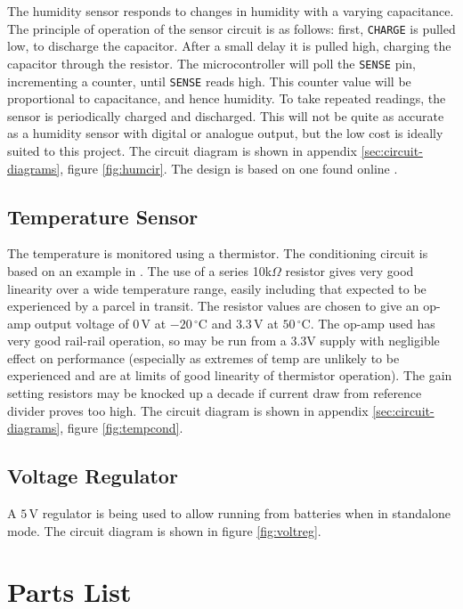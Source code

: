 \documentclass[a4paper,11pt]{article}  %
\providecommand{\degrees}{\ensuremath{^{\circ}}}
\begin{document}
The humidity sensor responds to changes in humidity with a varying
capacitance. The principle of operation of the sensor circuit is as
follows: first, \texttt{CHARGE} is pulled low, to discharge the
capacitor. After a small delay it is pulled high, charging the
capacitor through the resistor. The microcontroller will poll the
\texttt{SENSE} pin, incrementing a counter, until \texttt{SENSE} reads
high. This counter value will be proportional to capacitance, and
hence humidity. To take repeated readings, the sensor is periodically
charged and discharged. This will not be quite as accurate as a
humidity sensor with digital or analogue output, but the low cost is
ideally suited to this project. The circuit diagram is shown in
appendix \ref{sec:circuit-diagrams}, figure \ref{fig:humcir}. The
design is based on one found online \cite{hum_sens}.

\subsection{Temperature Sensor}

The temperature is monitored using a thermistor. The conditioning
circuit is based on an example in \cite{HH}. The use of a series
10k$\Omega$ resistor gives very good linearity over a wide temperature
range, easily including that expected to be experienced by a parcel in
transit. The resistor values are chosen to give an op-amp output
voltage of $0\,\mathrm{V}$ at $-20\,\mathrm{\degrees C}$ and
$3.3\,\mathrm{V}$ at $50\,\mathrm{\degrees C}$. The op-amp used has
very good rail-rail operation, so may be run from a 3.3V supply with
negligible effect on performance (especially as extremes of temp are
unlikely to be experienced and are at limits of good linearity of
thermistor operation). The gain setting resistors may be knocked up a
decade if current draw from reference divider proves too high. The
circuit diagram is shown in appendix \ref{sec:circuit-diagrams},
figure \ref{fig:tempcond}.

\subsection{Voltage Regulator}

A $5\,\mathrm{V}$ regulator is being used to allow running from
batteries when in standalone mode. The circuit diagram is shown in
figure \ref{fig:voltreg}.

\section{Parts List}
\label{sec:parts-list}
\end{document}

